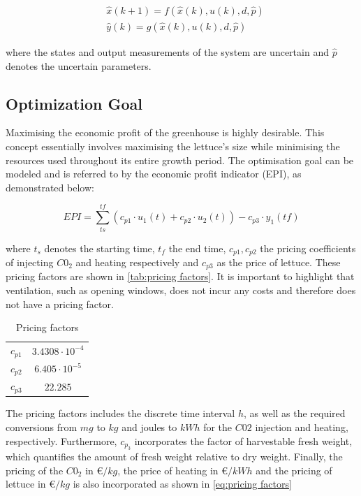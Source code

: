 \begin{equation}\label{eq:greenhouse_model_discrete_uncertain}
	\begin{aligned}
		& \hat x(k+1) = f(\hat x(k),u(k),d,\hat p) \\
		& \hat y(k) = g(\hat x(k),u(k),d,\hat p)
	\end{aligned}
\end{equation}

where the states and output measurements of the system are uncertain and $\hat{p}$ denotes the uncertain parameters.



\subsection{Optimization Goal}
\label{ssection:optimization-goal}
Maximising the economic profit of the greenhouse is highly desirable. This concept essentially involves maximising the lettuce's size while minimising the resources used throughout its entire growth period. The optimisation goal can be modeled and is referred to by the economic profit indicator (EPI), as demonstrated below:

\begin{equation}\label{eq:epi}
	EPI = \sum_{ts}^{tf} (c_{p1} \cdot u_1(t) + c_{p2} \cdot u_2(t)) - c_{p3} \cdot y_1(tf)
\end{equation}

where $t_s$ denotes the starting time, $t_f$ the end time, $c_{p1},c_{p2}$ the pricing coefficients of injecting $C0_2$ and heating respectively and $c_{p3}$ as the price of lettuce. These pricing factors are shown in \autoref{tab:pricing factors}. It is important to highlight that ventilation, such as opening windows, does not incur any costs and therefore does not have a pricing factor.

\begin{table}[H]
	\centering
	\begin{tabular}{|c c|}
		\hline
		$c_{p1}$& $3.4308\cdot 10^{-4}$ \\
		$c_{p2}$& $6.405\cdot 10^{-5}$\\
		$c_{p3}$& $22.285$\\ 
		\hline
	\end{tabular}
	\caption{Pricing factors}
	\label{tab:pricing factors}
\end{table}

The pricing factors includes the discrete time interval $h$, as well as the required conversions from $mg$ to $kg$ and joules to $kWh$ for the $C02$ injection and heating, respectively. Furthermore, $c_{p_3}$ incorporates the factor of harvestable fresh weight, which quantifies the amount of fresh weight relative to dry weight. Finally, the pricing of the $C0_2$ in \euro $/kg$, the price of heating in \euro$/kWh$ and the pricing of lettuce in \euro$/kg$ is also incorporated as shown in \autoref{eq:pricing factors}

